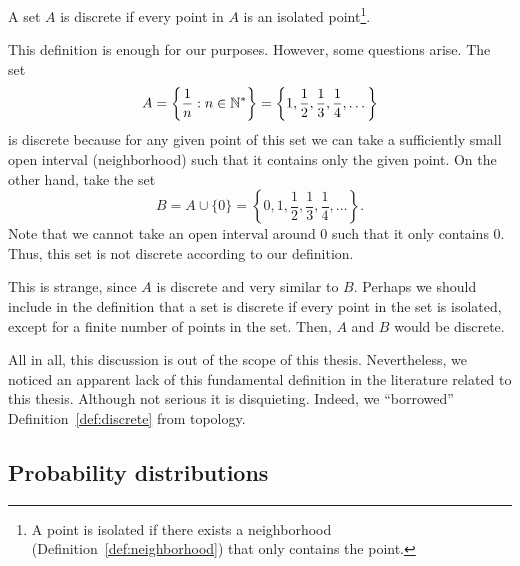 \begin{definition} \label{def:discrete}
    A set $A$ is discrete if every point in $A$ is an isolated point\footnote{A point is isolated if there exists a neighborhood (Definition~\ref{def:neighborhood}) that only contains the point.}.
\end{definition}

This definition is enough for our purposes. However, some questions arise.
%
The set $$A = \left\{\frac{1}{n} : n\in{\mathbb N}^*\right\} = \left\{1,\frac{1}{2},\frac{1}{3},\frac{1}{4},\dots\right\}$$ is discrete because for any given point of this set we can take a sufficiently small open interval (neighborhood) such that it contains only the given point.
%
On the other hand, take the set $$B = A \cup \{0\} = \left\{0,1,\frac{1}{2},\frac{1}{3},\frac{1}{4},\dots\right\}.$$
%
Note that we cannot take an open interval around $0$ such that it only contains $0$. Thus, this set is not discrete according to our definition.

This is strange, since $A$ is discrete and very similar to $B$.
%
Perhaps we should include in the definition that a set is discrete if every point in the set is isolated, except for a finite number of points in the set. Then, $A$ and $B$ would be discrete.

All in all, this discussion is out of the scope of this thesis.
%
Nevertheless, we noticed an apparent lack of this fundamental definition in the literature related to this thesis. Although not serious it is disquieting. Indeed, we ``borrowed'' Definition~\ref{def:discrete} from topology.

\subsection{Probability distributions}

